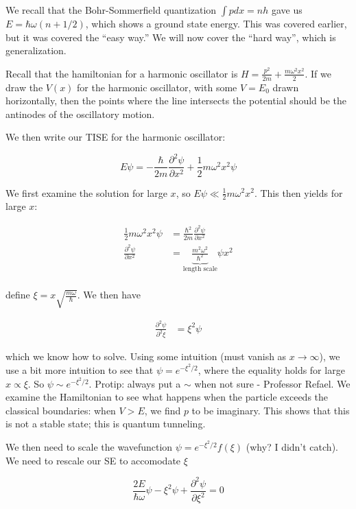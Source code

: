 \documentclass{report}
\begin{document}
We recall that the Bohr-Sommerfield quantization $\int p dx = nh$ gave us $E = \hbar \omega (n + 1/2)$, which shows a ground state energy. This was covered earlier, but it was covered the ``easy way.'' We will now cover the ``hard way'', which is generalization.

Recall that the hamiltonian for a harmonic oscillator is $H = \frac{p^2}{2m} + \frac{m\omega^2x^2}{2}$. If we draw the $V(x)$ for the harmonic oscillator, with some $V = E_0$ drawn horizontally, then the points where the line intersects the potential should be the antinodes of the oscillatory motion. 

We then write our TISE for the harmonic oscillator:

$$E\psi = -\frac{\hbar}{2m}\frac{\partial^2 \psi}{\partial x^2} + \frac{1}{2} m\omega^2x^2 \psi$$

We first examine the solution for large $x$, so $E\psi \ll \frac{1}{2}m\omega^2x^2$. This then yields for large $x$:

\begin{align*}
\frac{1}{2}m\omega^2x^2\psi &= \frac{\hbar^2}{2m}\frac{\partial^2\psi}{\partial x^2}\\
\frac{\partial^2\psi}{\partial x^2} &= \underbrace{\frac{m^2\omega^2}{\hbar^2}}_{\textrm{length scale}}\psi x^2\\
\end{align*}

define $\xi = x\sqrt{\frac{m\omega}{\hbar}}$. We then have

\begin{align*}
\frac{\partial^2\psi}{\partial^2 \xi} &= \xi^2\psi
\end{align*}

which we know how to solve. Using some intuition (must vanish as $x \to\infty$), we use a bit more intuition to see that $\psi = e^{-\xi^2/2}$, where the equality holds for large $x \propto \xi$. So $\psi \sim e^{-\xi^2/2}$. Protip: always put a $\sim$ when not sure - Professor Refael. We examine the Hamiltonian to see what happens when the particle exceeds the classical boundaries: when $V>E$, we find $p$ to be imaginary. This shows that this is not a stable state; this is quantum tunneling. 

We then need to scale the wavefunction $\psi = e^{-\xi^2/2}f(\xi)$ (why? I didn't catch). We need to rescale our SE to accomodate $\xi$

$$\frac{2E}{\hbar\omega}\psi -\xi^2\psi + \frac{\partial^2 \psi}{\partial \xi^2} = 0$$
\end{document}

